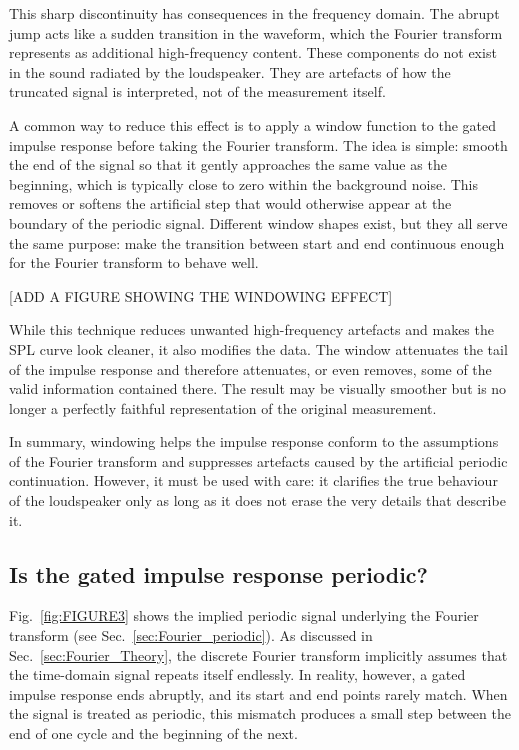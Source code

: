 \documentclass[12pt,a4paper]{article}
\providecommand{\secn}[1]{Sec.~\ref{sec:#1}}
\providecommand{\figr}[1]{Fig.~\ref{fig:#1}}
\begin{document}
This sharp discontinuity has consequences in the frequency domain. The abrupt jump acts like a sudden transition in the waveform, which the Fourier transform represents as additional high-frequency content. These components do not exist in the sound radiated by the loudspeaker. They are artefacts of how the truncated signal is interpreted, not of the measurement itself.

A common way to reduce this effect is to apply a window function to the gated impulse response before taking the Fourier transform. The idea is simple: smooth the end of the signal so that it gently approaches the same value as the beginning, which is typically close to zero within the background noise. This removes or softens the artificial step that would otherwise appear at the boundary of the periodic signal. Different window shapes exist, but they all serve the same purpose: make the transition between start and end continuous enough for the Fourier transform to behave well.

[ADD A FIGURE SHOWING THE WINDOWING EFFECT]

While this technique reduces unwanted high-frequency artefacts and makes the SPL curve look cleaner, it also modifies the data. The window attenuates the tail of the impulse response and therefore attenuates, or even removes, some of the valid information contained there. The result may be visually smoother but is no longer a perfectly faithful representation of the original measurement.

In summary, windowing helps the impulse response conform to the assumptions of the Fourier transform and suppresses artefacts caused by the artificial periodic continuation. However, it must be used with care: it clarifies the true behaviour of the loudspeaker only as long as it does not erase the very details that describe it.










\subsection{Is the gated impulse response periodic?}

\figr{FIGURE3} shows the implied periodic signal underlying the Fourier transform (see \secn{Fourier_periodic}). As discussed in \secn{Fourier_Theory}, the discrete Fourier transform implicitly assumes that the time-domain signal repeats itself endlessly. In reality, however, a gated impulse response ends abruptly, and its start and end points rarely match. When the signal is treated as periodic, this mismatch produces a small step between the end of one cycle and the beginning of the next.
\end{document}
